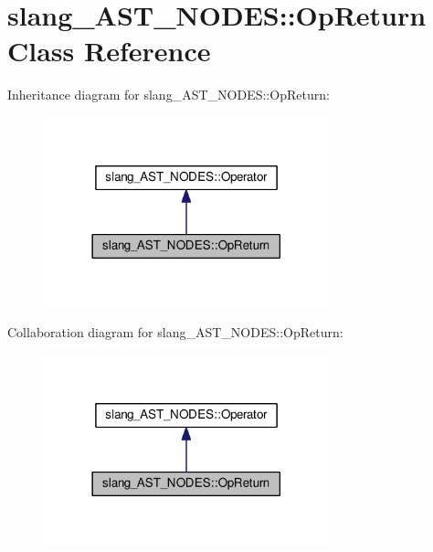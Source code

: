 \hypertarget{classslang__AST__NODES_1_1OpReturn}{}\section{slang\+\_\+\+A\+S\+T\+\_\+\+N\+O\+D\+ES\+:\+:Op\+Return Class Reference}
\label{classslang__AST__NODES_1_1OpReturn}


Inheritance diagram for slang\+\_\+\+A\+S\+T\+\_\+\+N\+O\+D\+ES\+:\+:Op\+Return\+:
\nopagebreak
\begin{figure}[H]
\begin{center}
\leavevmode
\includegraphics[width=234pt]{classslang__AST__NODES_1_1OpReturn__inherit__graph}
\end{center}
\end{figure}


Collaboration diagram for slang\+\_\+\+A\+S\+T\+\_\+\+N\+O\+D\+ES\+:\+:Op\+Return\+:
\nopagebreak
\begin{figure}[H]
\begin{center}
\leavevmode
\includegraphics[width=234pt]{classslang__AST__NODES_1_1OpReturn__coll__graph}
\end{center}
\end{figure}

